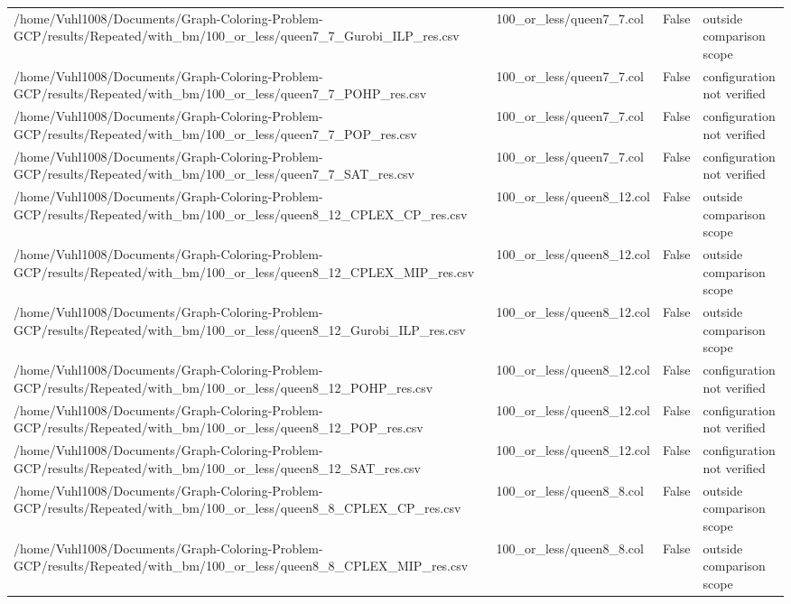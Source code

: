 \begin{table}[htbp]
\begin{tabular}{llll}
/home/Vuhl1008/Documents/Graph-Coloring-Problem-GCP/results/Repeated/with\_bm/100\_or\_less/queen7\_7\_Gurobi\_ILP\_res.csv & 100\_or\_less/queen7\_7.col & False & outside comparison scope \\
/home/Vuhl1008/Documents/Graph-Coloring-Problem-GCP/results/Repeated/with\_bm/100\_or\_less/queen7\_7\_POHP\_res.csv & 100\_or\_less/queen7\_7.col & False & configuration not verified \\
/home/Vuhl1008/Documents/Graph-Coloring-Problem-GCP/results/Repeated/with\_bm/100\_or\_less/queen7\_7\_POP\_res.csv & 100\_or\_less/queen7\_7.col & False & configuration not verified \\
/home/Vuhl1008/Documents/Graph-Coloring-Problem-GCP/results/Repeated/with\_bm/100\_or\_less/queen7\_7\_SAT\_res.csv & 100\_or\_less/queen7\_7.col & False & configuration not verified \\
/home/Vuhl1008/Documents/Graph-Coloring-Problem-GCP/results/Repeated/with\_bm/100\_or\_less/queen8\_12\_CPLEX\_CP\_res.csv & 100\_or\_less/queen8\_12.col & False & outside comparison scope \\
/home/Vuhl1008/Documents/Graph-Coloring-Problem-GCP/results/Repeated/with\_bm/100\_or\_less/queen8\_12\_CPLEX\_MIP\_res.csv & 100\_or\_less/queen8\_12.col & False & outside comparison scope \\
/home/Vuhl1008/Documents/Graph-Coloring-Problem-GCP/results/Repeated/with\_bm/100\_or\_less/queen8\_12\_Gurobi\_ILP\_res.csv & 100\_or\_less/queen8\_12.col & False & outside comparison scope \\
/home/Vuhl1008/Documents/Graph-Coloring-Problem-GCP/results/Repeated/with\_bm/100\_or\_less/queen8\_12\_POHP\_res.csv & 100\_or\_less/queen8\_12.col & False & configuration not verified \\
/home/Vuhl1008/Documents/Graph-Coloring-Problem-GCP/results/Repeated/with\_bm/100\_or\_less/queen8\_12\_POP\_res.csv & 100\_or\_less/queen8\_12.col & False & configuration not verified \\
/home/Vuhl1008/Documents/Graph-Coloring-Problem-GCP/results/Repeated/with\_bm/100\_or\_less/queen8\_12\_SAT\_res.csv & 100\_or\_less/queen8\_12.col & False & configuration not verified \\
/home/Vuhl1008/Documents/Graph-Coloring-Problem-GCP/results/Repeated/with\_bm/100\_or\_less/queen8\_8\_CPLEX\_CP\_res.csv & 100\_or\_less/queen8\_8.col & False & outside comparison scope \\
/home/Vuhl1008/Documents/Graph-Coloring-Problem-GCP/results/Repeated/with\_bm/100\_or\_less/queen8\_8\_CPLEX\_MIP\_res.csv & 100\_or\_less/queen8\_8.col & False & outside comparison scope \\

\end{tabular}
\end{table}
